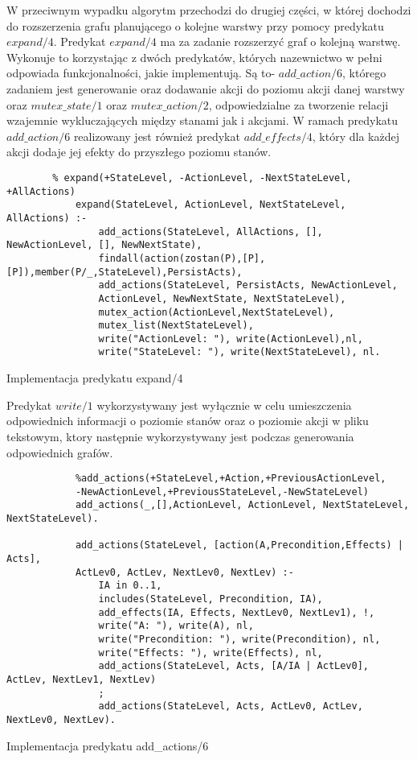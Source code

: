     W przeciwnym wypadku  algorytm przechodzi do drugiej części, 
    w której dochodzi do rozszerzenia grafu planującego o kolejne warstwy przy pomocy predykatu $expand/4$. 
    Predykat $expand/4$ ma za zadanie rozszerzyć graf o kolejną warstwę. Wykonuje to korzystając z dwóch predykatów, których nazewnictwo w pełni 
    odpowiada funkcjonalności, jakie implementują. Są to- $add\_action/6$, którego zadaniem jest generowanie oraz dodawanie akcji do poziomu akcji 
    danej warstwy oraz $mutex\_state/1$ oraz $mutex\_action/2$, odpowiedzialne za tworzenie relacji wzajemnie wykluczających między stanami jak i akcjami.
    W ramach predykatu $add\_action/6$ realizowany jest również predykat $add\_effects/4$, który dla każdej akcji dodaje jej efekty do przyszłego 
    poziomu stanów.
    
    
    \begin{listing}[H]
        \begin{verbatim}
        % expand(+StateLevel, -ActionLevel, -NextStateLevel, +AllActions)
            expand(StateLevel, ActionLevel, NextStateLevel, AllActions) :-
                add_actions(StateLevel, AllActions, [], NewActionLevel, [], NewNextState),
                findall(action(zostan(P),[P],[P]),member(P/_,StateLevel),PersistActs),
                add_actions(StateLevel, PersistActs, NewActionLevel, 
                ActionLevel, NewNextState, NextStateLevel),
                mutex_action(ActionLevel,NextStateLevel), 
                mutex_list(NextStateLevel),
                write("ActionLevel: "), write(ActionLevel),nl,
                write("StateLevel: "), write(NextStateLevel), nl.
    \end{verbatim}
    \caption{Implementacja predykatu expand/4}
    \end{listing}

    Predykat $write/1$ wykorzystywany jest wyłącznie w celu umieszczenia odpowiednich informacji o poziomie stanów oraz o poziomie akcji w pliku
    tekstowym, ktory następnie wykorzystywany jest podczas generowania odpowiednich grafów.

    \begin{listing}[H]
        \begin{verbatim}
            %add_actions(+StateLevel,+Action,+PreviousActionLevel,
            -NewActionLevel,+PreviousStateLevel,-NewStateLevel)
            add_actions(_,[],ActionLevel, ActionLevel, NextStateLevel, NextStateLevel).

            add_actions(StateLevel, [action(A,Precondition,Effects) | Acts], 
            ActLev0, ActLev, NextLev0, NextLev) :-
                IA in 0..1, 
                includes(StateLevel, Precondition, IA),
                add_effects(IA, Effects, NextLev0, NextLev1), !, 
                write("A: "), write(A), nl,
                write("Precondition: "), write(Precondition), nl,
                write("Effects: "), write(Effects), nl,
                add_actions(StateLevel, Acts, [A/IA | ActLev0], ActLev, NextLev1, NextLev)
                ;
                add_actions(StateLevel, Acts, ActLev0, ActLev, NextLev0, NextLev).
    \end{verbatim}
    \caption{Implementacja predykatu add\_actions/6}
    \end{listing}

